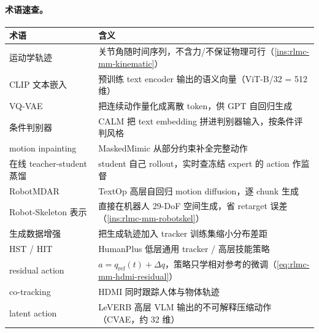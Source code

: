 \paragraph{术语速查。}
\begin{center}
\small
\begin{tabular}{@{}ll@{}}
\toprule
术语 & 含义 \\
\midrule
运动学轨迹 & 关节角随时间序列，不含力/不保证物理可行（\cref{ins:rlmc-mm-kinematic}） \\
CLIP 文本嵌入 & 预训练 text encoder 输出的语义向量（ViT-B/32 = 512 维） \\
VQ-VAE & 把连续动作量化成离散 token，供 GPT 自回归生成 \\
条件判别器 & CALM 把 text embedding 拼进判别器输入，按条件评判风格 \\
motion inpainting & MaskedMimic 从部分约束补全完整动作 \\
在线 teacher-student 蒸馏 & student 自己 rollout，实时查冻结 expert 的 action 作监督 \\
RobotMDAR & TextOp 高层自回归 motion diffusion，逐 chunk 生成 \\
Robot-Skeleton 表示 & 直接在机器人 29-DoF 空间生成，省 retarget 误差（\cref{ins:rlmc-mm-robotskel}） \\
生成数据增强 & 把生成轨迹加入 tracker 训练集缩小分布差距 \\
HST / HIT & HumanPlus 低层通用 tracker / 高层技能策略 \\
residual action & $a=q_{\text{ref}}(t)+\Delta q$，策略只学相对参考的微调（\cref{eq:rlmc-mm-hdmi-residual}） \\
co-tracking & HDMI 同时跟踪人体与物体轨迹 \\
latent action & LeVERB 高层 VLM 输出的不可解释压缩动作（CVAE，约 32 维） \\
\bottomrule
\end{tabular}
\end{center}

